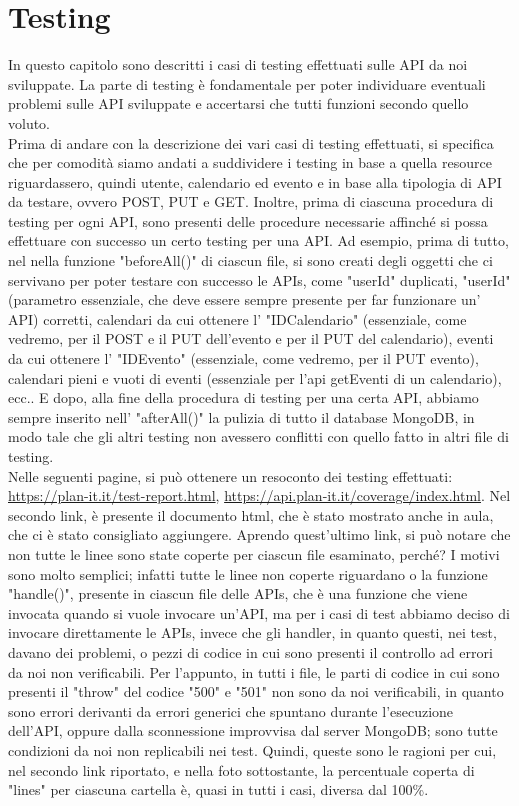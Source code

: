 \section{Testing}
\label{secD4:Testing}

In questo capitolo sono descritti i casi di testing effettuati sulle API da noi sviluppate. La parte di testing è fondamentale per poter individuare eventuali problemi sulle API sviluppate e accertarsi che tutti funzioni secondo quello voluto.\\
Prima di andare con la descrizione dei vari casi di testing effettuati, si specifica che per comodità siamo andati a suddividere i testing in base a quella resource riguardassero, quindi utente, calendario ed evento e in base alla tipologia di API da testare, ovvero POST, PUT e GET. Inoltre, prima di ciascuna procedura di testing per ogni API, sono presenti delle procedure necessarie affinché si possa effettuare con successo un certo testing per una API. Ad esempio, prima di tutto, nel nella funzione "beforeAll()" di ciascun file, si sono creati degli oggetti che ci servivano per poter testare con successo le APIs, come "userId" duplicati, "userId" (parametro essenziale, che deve essere sempre presente per far funzionare un' API) corretti, calendari da cui ottenere l' "IDCalendario" (essenziale, come vedremo, per il POST e il PUT dell'evento e per il PUT del calendario), eventi da cui ottenere l' "IDEvento" (essenziale, come vedremo, per il PUT evento), calendari pieni e vuoti di eventi (essenziale per l'api getEventi di un calendario), ecc.. E dopo, alla fine della procedura di testing per una certa API, abbiamo sempre inserito nell' "afterAll()" la pulizia di tutto il database MongoDB, in modo tale che gli altri testing non avessero conflitti con quello fatto in altri file di testing. \\ Nelle seguenti pagine, si può ottenere un resoconto dei testing effettuati: \href{https://plan-it.it/test-report.html} {https://plan-it.it/test-report.html}, \href{https://api.plan-it.it/coverage/index.html} {https://api.plan-it.it/coverage/index.html}. Nel secondo link, è presente il documento html, che è stato mostrato anche in aula, che ci è stato consigliato aggiungere. Aprendo quest'ultimo link, si può notare che non tutte le linee sono state coperte per ciascun file esaminato, perché? I motivi sono molto semplici; infatti tutte le linee non coperte riguardano o la funzione "handle()", presente in ciascun file delle APIs, che è una funzione che viene invocata quando si vuole invocare un'API, ma per i casi di test abbiamo deciso di invocare direttamente le APIs, invece che gli handler, in quanto questi, nei test, davano dei problemi, o pezzi di codice in cui sono presenti il controllo ad errori da noi non verificabili. Per l'appunto, in tutti i file, le parti di codice in cui sono presenti il "throw" del codice "500" e "501" non sono da noi verificabili, in quanto sono errori derivanti da errori generici che spuntano durante l'esecuzione dell'API, oppure dalla sconnessione improvvisa dal server MongoDB; sono tutte condizioni da noi non replicabili nei test. Quindi, queste sono le ragioni per cui, nel secondo link riportato, e nella foto sottostante, la percentuale coperta di "lines" per ciascuna cartella è, quasi in tutti i casi, diversa dal 100\%.

